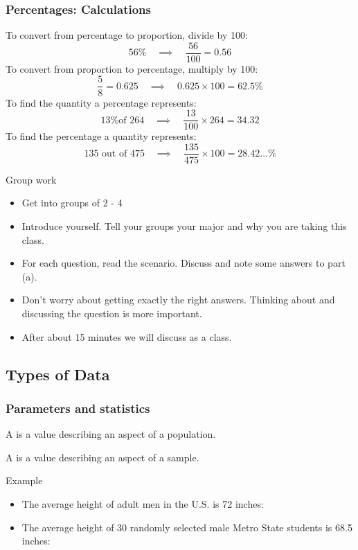 \documentclass[xcolor=table]{beamer}
\begin{document}
\begin{frame}
\frametitle{Percentages: Calculations}
\begin{exampleblock}{}
To convert from percentage to proportion, divide by 100:
\[56\% \quad \implies \quad \frac {56}{100} = 0.56\]
\pause
To convert from proportion to percentage, multiply by 100:
\[\frac 5 8 = 0.625 \quad \implies \quad 0.625 \times 100 = 62.5\%\]
\pause
To find the quantity a percentage represents:
\[\text{13\% of 264}\quad \implies \quad \frac {13}{100} \times 264 = 34.32\]
\pause
To find the percentage a quantity represents:
\[\text{135 out of 475} \quad \implies \quad \frac {135}{475} \times 100 = 28.42\ldots \%\]
\end{exampleblock}
\end{frame}

\begin{frame}{Group work}
\begin{block}{}
\large
\begin{itemize}
\item Get into groups of 2 - 4
\item Introduce yourself. Tell your groups your major and why you are taking this class. 
\item For each question, read the scenario. Discuss and note some answers to part (a).
\item Don't worry about getting exactly the right answers. Thinking about and discussing the question is more important.
\item After about 15 minutes we will discuss as a class. 
\end{itemize}
\end{block}
\end{frame}

\subsection{Types of Data}

\begin{frame}
\frametitle{Parameters and statistics}

\begin{block}{}
\large A  is a value describing an aspect of a population.
\end{block}
\pause
\begin{block}{}
\large A  is a value describing an aspect of a sample.
\end{block}
\pause
\begin{exampleblock}{Example}
\begin{itemize}
\item The average height of adult men in the U.S. is 72 inches: 

\item The average height of 30 randomly selected male Metro State students is 68.5 inches: 
\end{itemize}
\end{exampleblock}

\end{frame}
\end{document}
